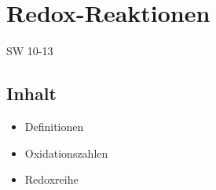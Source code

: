 \section{Redox-Reaktionen} {SW 10-13}

\subsection{Inhalt}
\begin{itemize}
\item Definitionen
\item  Oxidationszahlen
\item Redoxreihe
\end{itemize}
